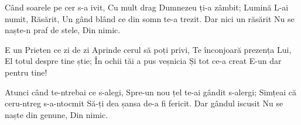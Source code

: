 \beginverse
Când soarele pe cer s-a ivit,
Cu mult drag Dumnezeu ți-a zâmbit;
Lumină L-ai numit, Răsărit,
Un gând blând ce din somn te-a trezit.
Dar nici un răsărit
Nu se naște-n praf de stele,
Din nimic.
\endverse

\beginchorus
E un Prieten ce zi de zi
Aprinde cerul să poți privi,
Te înconjoară prezența Lui,
El totul despre tine știe;
În ochii tăi a pus veșnicia
Și tot ce-a creat
E-un dar pentru tine!
\endchorus

\beginverse
Atunci când te-ntrebai ce s-alegi,
Spre-un nou țel te-ai gândit s-alergi;
Simțeai că ceru-ntreg s-a-ntocmit
Să-ți dea șansa de-a fi fericit.
Dar gândul iscusit
Nu se naște din genune,
Din nimic.
\endverse
\endsong